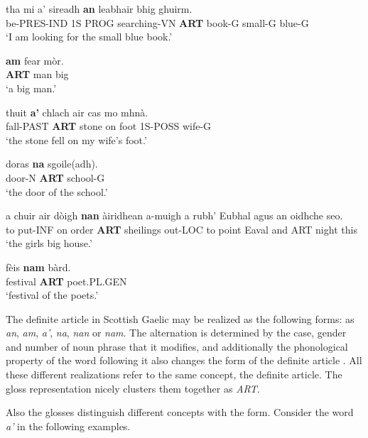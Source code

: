 \documentclass[11pt,a4paper]{article}
\begin{document}
\begin{exe}  
\ex 
\gll tha mi a' sireadh \textbf{an} leabhair bhig ghuirm.\\
be-PRES-IND 1S PROG searching-VN \textbf{ART} book-G small-G blue-G\\
\glt `I am looking for the small blue book.' \citep[p. 29]{lamb2001scottish}

\ex 
\gll \textbf{am} fear m\`or.\\
\textbf{ART} man big\\
\glt `a big man.' \citep[p. 31]{lamb2001scottish}

\ex
\gll thuit \textbf{a'} chlach air cas mo mhn\`a.\\
fall-PAST \textbf{ART} stone on foot 1S-POSS wife-G\\
\glt`the stone fell on my wife's foot.' \citep[p. 30]{lamb2001scottish} 	

\ex
\gll doras \textbf{na} sgoile(adh). \\
door-N \textbf{ART} school-G \\
\glt `the door of the school.' \citep[p. 29]{lamb2001scottish} 	

\ex 
\gll a chuir air d\`oigh \textbf{nan} \`airidhean a-muigh a rubh' Eubhal agus an oidhche seo. \\
to put-INF on order \textbf{ART} sheilings out-LOC to point Eaval and ART night this \\
\glt `the girls big house.' \citep[p. 100]{lamb2001scottish} 

\ex
\gll f\`eis \textbf{nam} b\`ard.\\
festival \textbf{ART} poet.PL.GEN\\
\glt `festival of the poets.' \citep[p. 107]{lamb2001scottish}

\end{exe}

The definite article in Scottish Gaelic may be realized as the following forms: as \textit{an}, \textit{am}, \textit{a'}, \textit{na}, \textit{nan} or \textit{nam}. The alternation is determined by the case, gender and number of noun phrase that it modifies, and additionally the phonological property of the word following it also changes the form of the definite article \citep{lamb2001scottish}. All these different realizations refer to the same concept, the definite article. The gloss representation nicely clusters them together as \textit{ART}.

Also the glosses distinguish different concepts with the form. Consider the word \textit{a'} in the following examples.  
\end{document}
